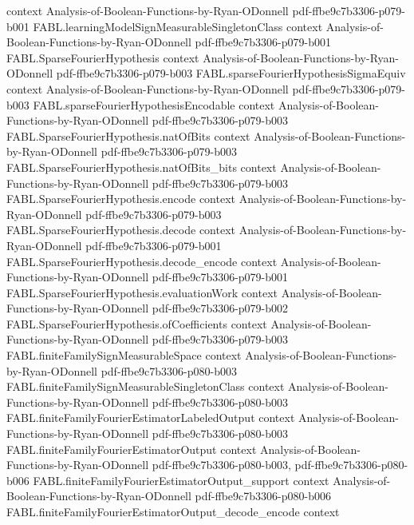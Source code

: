 \begin{theorem}
  {context}
  {Analysis-of-Boolean-Functions-by-Ryan-ODonnell}
  {pdf-ffbe9c7b3306-p079-b001}
\proofstep
  {FABL.learningModelSignMeasurableSingletonClass}
  {context}
  {Analysis-of-Boolean-Functions-by-Ryan-ODonnell}
  {pdf-ffbe9c7b3306-p079-b001}
\proofstep
  {FABL.SparseFourierHypothesis}
  {context}
  {Analysis-of-Boolean-Functions-by-Ryan-ODonnell}
  {pdf-ffbe9c7b3306-p079-b003}
\proofstep
  {FABL.sparseFourierHypothesisSigmaEquiv}
  {context}
  {Analysis-of-Boolean-Functions-by-Ryan-ODonnell}
  {pdf-ffbe9c7b3306-p079-b003}
\proofstep
  {FABL.sparseFourierHypothesisEncodable}
  {context}
  {Analysis-of-Boolean-Functions-by-Ryan-ODonnell}
  {pdf-ffbe9c7b3306-p079-b003}
\proofstep
  {FABL.SparseFourierHypothesis.natOfBits}
  {context}
  {Analysis-of-Boolean-Functions-by-Ryan-ODonnell}
  {pdf-ffbe9c7b3306-p079-b003}
\proofstep
  {FABL.SparseFourierHypothesis.natOfBits_bits}
  {context}
  {Analysis-of-Boolean-Functions-by-Ryan-ODonnell}
  {pdf-ffbe9c7b3306-p079-b003}
\proofstep
  {FABL.SparseFourierHypothesis.encode}
  {context}
  {Analysis-of-Boolean-Functions-by-Ryan-ODonnell}
  {pdf-ffbe9c7b3306-p079-b003}
\proofstep
  {FABL.SparseFourierHypothesis.decode}
  {context}
  {Analysis-of-Boolean-Functions-by-Ryan-ODonnell}
  {pdf-ffbe9c7b3306-p079-b001}
\proofstep
  {FABL.SparseFourierHypothesis.decode_encode}
  {context}
  {Analysis-of-Boolean-Functions-by-Ryan-ODonnell}
  {pdf-ffbe9c7b3306-p079-b001}
\proofstep
  {FABL.SparseFourierHypothesis.evaluationWork}
  {context}
  {Analysis-of-Boolean-Functions-by-Ryan-ODonnell}
  {pdf-ffbe9c7b3306-p079-b002}
\proofstep
  {FABL.SparseFourierHypothesis.ofCoefficients}
  {context}
  {Analysis-of-Boolean-Functions-by-Ryan-ODonnell}
  {pdf-ffbe9c7b3306-p079-b003}
\proofstep
  {FABL.finiteFamilySignMeasurableSpace}
  {context}
  {Analysis-of-Boolean-Functions-by-Ryan-ODonnell}
  {pdf-ffbe9c7b3306-p080-b003}
\proofstep
  {FABL.finiteFamilySignMeasurableSingletonClass}
  {context}
  {Analysis-of-Boolean-Functions-by-Ryan-ODonnell}
  {pdf-ffbe9c7b3306-p080-b003}
\proofstep
  {FABL.finiteFamilyFourierEstimatorLabeledOutput}
  {context}
  {Analysis-of-Boolean-Functions-by-Ryan-ODonnell}
  {pdf-ffbe9c7b3306-p080-b003}
\proofstep
  {FABL.finiteFamilyFourierEstimatorOutput}
  {context}
  {Analysis-of-Boolean-Functions-by-Ryan-ODonnell}
  {pdf-ffbe9c7b3306-p080-b003,
    pdf-ffbe9c7b3306-p080-b006}
\proofstep
  {FABL.finiteFamilyFourierEstimatorOutput_support}
  {context}
  {Analysis-of-Boolean-Functions-by-Ryan-ODonnell}
  {pdf-ffbe9c7b3306-p080-b006}
\proofstep
  {FABL.finiteFamilyFourierEstimatorOutput_decode_encode}
  {context}

\end{theorem}

